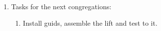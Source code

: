 \begin{enumerate}
\begin{enumerate}
    \end{enumerate}
    \newpage
    
	\item Tasks for the next congregations:
	\begin{enumerate}
	  \item Install guids, assemble the lift and test to it.
	  
    \end{enumerate}     
\end{enumerate}
\fillpage
